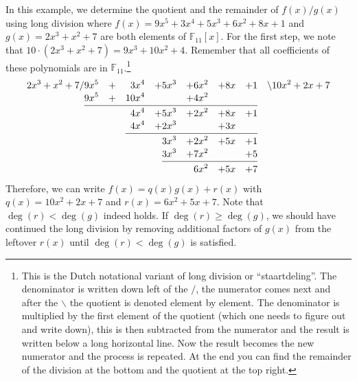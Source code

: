 \documentclass[openany, a4paper, 10pt]{book}
\theoremstyle{plain}
\theoremstyle{plain}
\theoremstyle{plain}
\theoremstyle{definition}
\theoremstyle{plain}
\theoremstyle{definition}
\theoremstyle{remark}
\begin{document}
\begin{examplebox}[label={long_div_ex}, nameref={long division example}]
    In this example, we determine the quotient and the remainder of
    $f(x)/g(x)$ using long division where
    $f(x)=9x^5 + 3x^4 + 5x^3 + 6x^2 + 8x + 1$ and
    $g(x)=2x^3 + x^2 + 7$ are both elements of $\mathbb F_{11}[x]$.
    For the first step, we note that $10\cdot (2x^3 + x^2 + 7) = 9x^3 + 10x^2 + 4$.
    Remember that all coefficients of these polynomials are in $\mathbb F_{11}$.\footnote[2]{
        This is the Dutch notational variant of long division or ``staartdeling''.
        The denominator is written down left of the $/$,
        the numerator comes next
        and after the $\backslash$ the quotient is denoted
        element by element.
        The denominator is multiplied by the first element
        of the quotient (which one needs to figure out and write down), this is then subtracted from the numerator
        and the result is written below a long horizontal line.
        Now the result becomes the new numerator and the process is repeated.
        At the end you can find the remainder of the division at the bottom and the quotient at the top right.
    }
    \begin{alignat*}{8}
        2x^3 + x^2 + 7 /&  9x^5  &+&&  3&x^4  &+&  5x^3  &+&  6x^2  &+&  8x  &+&  1  & \backslash 10x^2 + 2x + 7 \\[-.3em]
                        &  9x^5  &+&& 10&x^4  & &        &+&  4x^2  & &      & &     &\\[-1em] \cline{2-14} \\[-2em]
                        &        & &&  4&x^4  &+&  5x^3  &+&  2x^2  &+&  8x  &+&  1  &\\[-.3em]
                        &        & &&  4&x^4  &+&  2x^3  & &        &+&  3x  & &     &\\[-1em] \cline{5-14} \\[-2em]
                        &        & &&   &     & &  3x^3  &+&  2x^2  &+&  5x  &+&  1  &\\[-.3em]
                        &        & &&   &     & &  3x^3  &+&  7x^2  & &      &+&  5  &\\[-1em] \cline{8-14} \\[-2em]
                        &        & &&   &     & &        & &  6x^2  &+&  5x  &+&  7  &
    \end{alignat*}
    Therefore, we can write $f(x) = q(x)g(x) + r(x)$ with $q(x) = 10x^2+2x+7$ and $r(x)=6x^2+5x+7$.
    Note that $\deg(r) < \deg(g)$ indeed holds.
    If $\deg(r) \geq \deg(g)$, we should have continued the long division by removing additional factors of $g(x)$ from the leftover $r(x)$ until $\deg(r) < \deg(g)$ is satisfied.
\end{examplebox}
\end{document}
